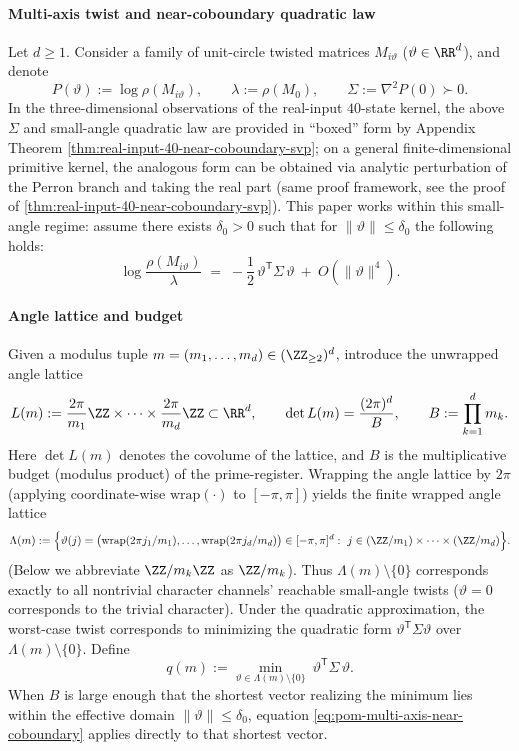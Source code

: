 \paragraph{Multi-axis twist and near-coboundary quadratic law}
Let \(d\ge 1\).
Consider a family of unit-circle twisted matrices \(M_{i\vartheta}\) (\(\vartheta\in\RR^d\)), and denote
\[
P(\vartheta):=\log\rho(M_{i\vartheta}),\qquad \lambda:=\rho(M_{0}),\qquad \Sigma:=\nabla^2P(0)\succ 0.
\]
In the three-dimensional observations of the real-input \(40\)-state kernel, the above \(\Sigma\) and small-angle quadratic law are provided in ``boxed'' form by Appendix Theorem \ref{thm:real-input-40-near-coboundary-svp}; on a general finite-dimensional primitive kernel, the analogous form can be obtained via analytic perturbation of the Perron branch and taking the real part (same proof framework, see the proof of \ref{thm:real-input-40-near-coboundary-svp}).
This paper works within this small-angle regime: assume there exists \(\delta_0>0\) such that for \(\|\vartheta\|\le \delta_0\) the following holds:
\begin{equation}\label{eq:pom-multi-axis-near-coboundary}
\log\frac{\rho(M_{i\vartheta})}{\lambda}
\;=\;
-\frac12\,\vartheta^{\mathsf T}\Sigma\,\vartheta\ +\ O(\|\vartheta\|^4).
\end{equation}

\paragraph{Angle lattice and budget}
Given a modulus tuple \(m=(m_1,\dots,m_d)\in(\ZZ_{\ge 2})^d\), introduce the unwrapped angle lattice
\[
L(m):=\frac{2\pi}{m_1}\ZZ\times\cdots\times\frac{2\pi}{m_d}\ZZ\subset\RR^d,
\qquad
\det L(m)=\frac{(2\pi)^d}{B},
\qquad
B:=\prod_{k=1}^d m_k.
\]
Here \(\det L(m)\) denotes the covolume of the lattice, and \(B\) is the multiplicative budget (modulus product) of the prime-register.
Wrapping the angle lattice by \(2\pi\) (applying coordinate-wise \(\mathrm{wrap}(\cdot)\) to \([-\pi,\pi]\)) yields the finite wrapped angle lattice
\[
\Lambda(m):=\Bigl\{\vartheta(j)
=\bigl(\mathrm{wrap}(2\pi j_1/m_1),\dots,\mathrm{wrap}(2\pi j_d/m_d)\bigr)\in[-\pi,\pi]^d:\ j\in(\ZZ/m_1)\times\cdots\times(\ZZ/m_d)\Bigr\}.
\]
(Below we abbreviate \(\ZZ/m_k\ZZ\) as \(\ZZ/m_k\)).
Thus \(\Lambda(m)\setminus\{0\}\) corresponds exactly to all nontrivial character channels' reachable small-angle twists (\(\vartheta=0\) corresponds to the trivial character).
Under the quadratic approximation, the worst-case twist corresponds to minimizing the quadratic form \(\vartheta^{\mathsf T}\Sigma\vartheta\) over \(\Lambda(m)\setminus\{0\}\).
Define
\begin{equation}\label{eq:pom-multi-axis-qm}
q(m):=\min_{\vartheta\in\Lambda(m)\setminus\{0\}}\ \vartheta^{\mathsf T}\Sigma\,\vartheta.
\end{equation}
When \(B\) is large enough that the shortest vector realizing the minimum lies within the effective domain \(\|\vartheta\|\le\delta_0\), equation \eqref{eq:pom-multi-axis-near-coboundary} applies directly to that shortest vector.

